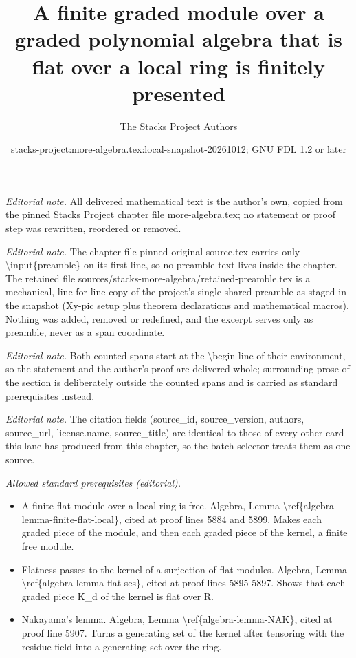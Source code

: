 \documentclass[10pt,a4paper]{amsart}
\title{A finite graded module over a graded polynomial algebra that is flat over a local ring is finitely presented}
\author{The Stacks Project Authors}
\date{stacks-project:more-algebra.tex:local-snapshot-20261012; GNU FDL 1.2 or later}
\theoremstyle{plain}
\theoremstyle{definition}
\theoremstyle{remark}
\numberwithin{equation}{subsection}
\begin{document}
\maketitle
\setcounter{subsection}{1}
\noindent\textit{Editorial note.} All delivered mathematical text is the author's own, copied from the pinned Stacks Project chapter file more-algebra.tex; no statement or proof step was rewritten, reordered or removed.\par\medskip
\noindent\textit{Editorial note.} The chapter file pinned-original-source.tex carries only \textbackslash{}input\{preamble\} on its first line, so no preamble text lives inside the chapter. The retained file sources/stacks-more-algebra/retained-preamble.tex is a mechanical, line-for-line copy of the project's single shared preamble as staged in the snapshot (Xy-pic setup plus theorem declarations and mathematical macros). Nothing was added, removed or redefined, and the excerpt serves only as preamble, never as a span coordinate.\par\medskip
\noindent\textit{Editorial note.} Both counted spans start at the \textbackslash{}begin line of their environment, so the statement and the author's proof are delivered whole; surrounding prose of the section is deliberately outside the counted spans and is carried as standard prerequisites instead.\par\medskip
\noindent\textit{Editorial note.} The citation fields (source\_id, source\_version, authors, source\_url, license.name, source\_title) are identical to those of every other card this lane has produced from this chapter, so the batch selector treats them as one source.\par\medskip
\noindent\textit{Allowed standard prerequisites (editorial).}\begin{itemize}
\item A finite flat module over a local ring is free. Algebra, Lemma \textbackslash{}ref\{algebra-lemma-finite-flat-local\}, cited at proof lines 5884 and 5899. Makes each graded piece of the module, and then each graded piece of the kernel, a finite free module.
\item Flatness passes to the kernel of a surjection of flat modules. Algebra, Lemma \textbackslash{}ref\{algebra-lemma-flat-ses\}, cited at proof lines 5895-5897. Shows that each graded piece K\_d of the kernel is flat over R.
\item Nakayama's lemma. Algebra, Lemma \textbackslash{}ref\{algebra-lemma-NAK\}, cited at proof line 5907. Turns a generating set of the kernel after tensoring with the residue field into a generating set over the ring.
\end{itemize}\medskip
\end{document}
